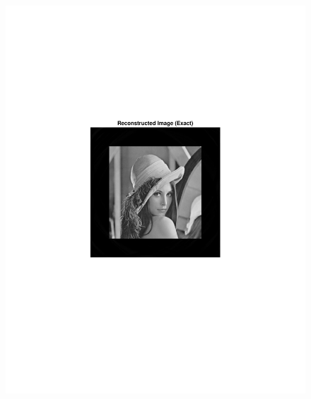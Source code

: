 \documentclass{UCF_ETD}
\begin{document}
 
 \begin{figure}[H]
 \begin{center}
 \includegraphics[scale=0.7]{PolarSphericalDFT/CornerCompensatedPaddedReconstruction}

\end{center}
\end{figure}
\end{document}

